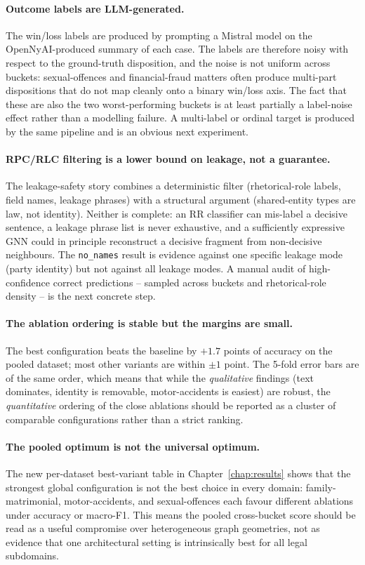 \paragraph{Outcome labels are LLM-generated.} The win/loss labels are
produced by prompting a Mistral model on the OpenNyAI-produced summary
of each case. The labels are therefore noisy with respect to the
ground-truth disposition, and the noise is not uniform across
buckets: sexual-offences and financial-fraud matters often produce
multi-part dispositions that do not map cleanly onto a binary
win/loss axis. The fact that these are also the two worst-performing
buckets is at least partially a label-noise effect rather than a
modelling failure. A multi-label or ordinal target is produced by the
same pipeline and is an obvious next experiment.

\paragraph{RPC/RLC filtering is a lower bound on leakage, not a
guarantee.} The leakage-safety story combines a deterministic filter
(rhetorical-role labels, field names, leakage phrases) with a
structural argument (shared-entity types are law, not identity).
Neither is complete: an RR classifier can mis-label a decisive
sentence, a leakage phrase list is never exhaustive, and a sufficiently
expressive GNN could in principle reconstruct a decisive fragment
from non-decisive neighbours. The \texttt{no\_names} result is
evidence against one specific leakage mode (party identity) but not
against all leakage modes. A manual audit of high-confidence correct
predictions -- sampled across buckets and rhetorical-role density --
is the next concrete step.

\paragraph{The ablation ordering is stable but the margins are
small.} The best configuration beats the baseline by $+1.7$ points of
accuracy on the pooled dataset; most other variants are within
$\pm 1$ point. The 5-fold error bars are of the same order, which
means that while the \emph{qualitative} findings (text dominates,
identity is removable, motor-accidents is easiest) are robust, the
\emph{quantitative} ordering of the close ablations should be
reported as a cluster of comparable configurations rather than a
strict ranking.

{\paragraph{The pooled optimum is not the universal optimum.}
The new per-dataset best-variant table in Chapter~\ref{chap:results}
shows that the strongest global configuration is not the best choice in
every domain: family-matrimonial, motor-accidents, and
sexual-offences each favour different ablations under accuracy or
macro-F1. This means the pooled cross-bucket score should be read as a
useful compromise over heterogeneous graph geometries, not as evidence
that one architectural setting is intrinsically best for all legal
subdomains.}

